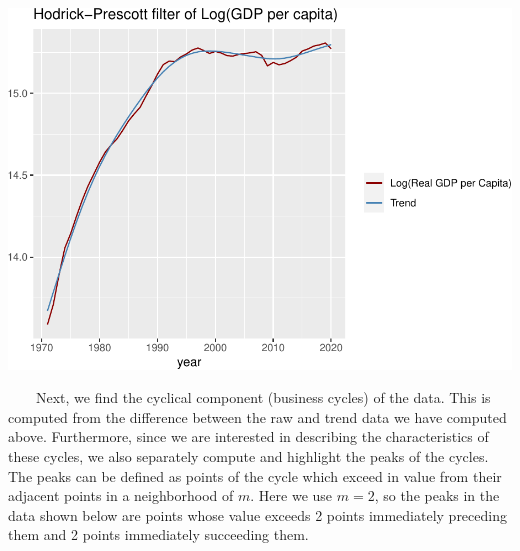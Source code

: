 \documentclass[
]{article}
\begin{document}
\includegraphics{rbc_report_files/figure-latex/unnamed-chunk-1-1.pdf}

~~~~Next, we find the cyclical component (business cycles) of the data.
This is computed from the difference between the raw and trend data we
have computed above. Furthermore, since we are interested in describing
the characteristics of these cycles, we also separately compute and
highlight the peaks of the cycles. The peaks can be defined as points of
the cycle which exceed in value from their adjacent points in a
neighborhood of \(m\). Here we use \(m=2\), so the peaks in the data
shown below are points whose value exceeds 2 points immediately
preceding them and 2 points immediately succeeding them.
\end{document}
